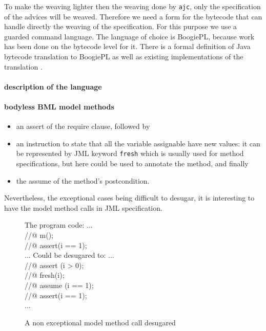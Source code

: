 To make the weaving lighter then the weaving done by {\tt ajc}, only
the specification of the advices will be weaved. Therefore we need a form
for the bytecode that can handle directly the weaving of the specification.
For this purpose we use a guarded command language. The language of 
choice is BoogiePL, because work has been done on the bytecode level for it.
There is a formal definition of Java bytecode translation to BoogiePL 
\cite{LehnerM07} as well as existing implementations of the translation
\cite{javatrans07,coqtrans06}.

\paragraph{description of the language}

\paragraph{bodyless BML model methods}

\begin{itemize} 
\item 
an assert of the require clause, followed by
\item 
an instruction to state that all the variable assignable have new
values: it can be represented by JML keyword {\tt fresh} which is
usually used for method specifications, but here could be used to
annotate the method, and finally
\item the assume of the method's postcondition.
\end{itemize}
Nevertheless, the exceptional cases being difficult to desugar, it is
interesting to have the model method calls in JML specification.

\begin{figure}
\begin{center}\begin{minipage}{4cm}
The program code:
\bcode
...\\
//@ m();\\
//@ assert(i == 1);\\
...
\ecode
Could be desugared to:
\bcode
...\\
//@ assert (i > 0);\\
//@ fresh(i);\\
//@ assume (i == 1);\\
//@ assert(i == 1);\\
...
\ecode
\end{minipage}\end{center}
\caption{A non exceptional model method call desugared}
\label{model_meth}
\end{figure}
